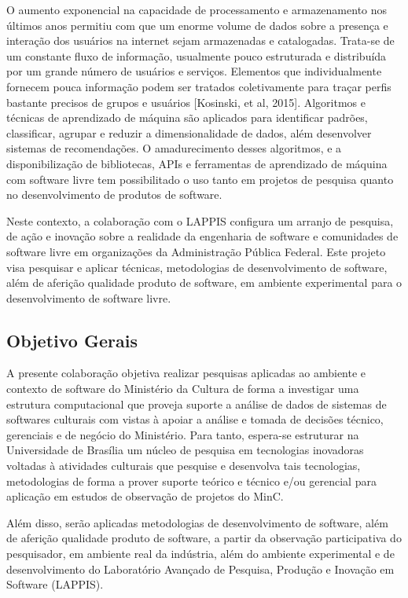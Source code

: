 O aumento exponencial na capacidade de processamento e armazenamento nos
últimos anos permitiu com que um enorme volume de dados sobre a presença e interação
dos usuários na internet sejam armazenadas e catalogadas. Trata-se de um constante
fluxo de informação, usualmente pouco estruturada e distribuída por um grande número
de usuários e serviços. Elementos que individualmente fornecem pouca informação
podem ser tratados coletivamente para traçar perfis bastante precisos de grupos e usuários [Kosinski, et al, 2015].
Algoritmos e técnicas de aprendizado de máquina são aplicados para identificar padrões,
classificar, agrupar e reduzir a dimensionalidade de dados, além desenvolver sistemas de recomendações.
O amadurecimento desses algoritmos, e a disponibilização de bibliotecas, APIs e ferramentas de aprendizado de máquina 
com software livre tem possibilitado o uso tanto em projetos de pesquisa quanto no desenvolvimento de produtos de software.

Neste contexto, a colaboração com o LAPPIS configura um arranjo de pesquisa, de ação e inovação sobre a realidade da engenharia
de software e comunidades de software livre em organizações da Administração Pública Federal. Este projeto visa pesquisar
e aplicar técnicas, metodologias de desenvolvimento de software, além de aferição qualidade produto de software, em ambiente experimental 
para o desenvolvimento de software livre. 

\subsection{Objetivo Gerais}

A presente colaboração objetiva realizar pesquisas aplicadas ao ambiente e contexto de software do Ministério da Cultura de forma a investigar uma estrutura computacional que proveja suporte a análise de dados de sistemas de softwares culturais com vistas à apoiar a análise e tomada de decisões técnico, gerenciais e de negócio do Ministério.
Para tanto, espera-se estruturar na Universidade de Brasília um núcleo de pesquisa em tecnologias inovadoras voltadas à atividades culturais que pesquise e desenvolva tais tecnologias, metodologias de forma a prover suporte teórico e técnico e/ou gerencial para aplicação em estudos de observação de projetos do MinC. 

Além disso, serão aplicadas metodologias de desenvolvimento de software, além de aferição qualidade produto de software, a partir da observação participativa do pesquisador, em ambiente real da indústria, além do ambiente experimental e de desenvolvimento do Laboratório Avançado de Pesquisa, Produção e Inovação em Software (LAPPIS).

